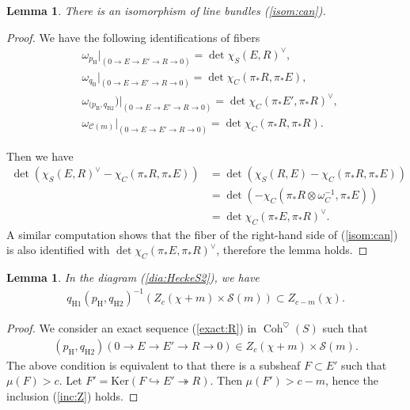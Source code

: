 \documentclass [11pt,oneside,a4paper,mathscr]{amsart}
\newtheorem{lemma}[thm]{Lemma}
\theoremstyle{definition}
\newcommand{\Coh}{\operatorname{Coh}}
\begin{document}
\begin{lemma}\label{lem:isomcan}
    There is an isomorphism of line bundles (\ref{isom:can}). 
\end{lemma}
    \begin{proof}
    We have the following 
identifications of fibers
\begin{align*}
    &\omega_{p_{\mathrm{H}}^{}}|_{(0\to E\to E'\to R\to 0)}=\det \chi_S(E, R)^{\vee}, \\
    &\omega_{q_{\mathrm{B}}^{}}|_{(0\to E\to E'\to R\to 0)}=\det \chi_C(\pi_{*}R, \pi_{*}E), \\
     &\omega_{(p_{\mathrm{B}}^{}, q_{\mathrm{B}2}^{}})|_{(0\to E\to E'\to R\to 0)}=\det \chi_C(\pi_{*}E', \pi_{*}R)^{\vee}, \\
     &\omega_{\mathcal{C}(m)}|_{(0\to E\to E'\to R\to 0)}=\det\chi_C(\pi_{*}R, \pi_{*}R).
\end{align*}

Then we have 
\begin{align*}
    \det (\chi_S(E, R)^{\vee}-\chi_C(\pi_{*}R, \pi_{*}E))&=
    \det(\chi_S(R, E)-\chi_C(\pi_{*}R, \pi_{*}E)) \\
    &=\det (-\chi_C(\pi_{*}R\otimes \omega_C^{-1}, \pi_{*}E))\\
    &=\det \chi_C(\pi_{*}E, \pi_{*}R)^{\vee}. 
\end{align*}
A similar computation shows that the fiber of 
the right-hand side of (\ref{isom:can}) is also identified with $\det \chi_C(\pi_{*}E, \pi_{*}R)^{\vee}$, therefore the lemma holds. 
    \end{proof}
    \begin{lemma}\label{lem:support}
In the diagram (\ref{dia:HeckeS2}), we have 
\begin{align}\label{inc:Z}
q_{\mathrm{H}1}^{}(p_{\mathrm{H}}^{}, q_{\mathrm{H}2}^{})^{-1}(Z_c(\chi+m)\times \mathcal{S}(m)) \subset Z_{c-m}(\chi).
\end{align}
    \end{lemma}
\begin{proof}
We consider an exact sequence (\ref{exact:R}) in $\Coh^{\heartsuit}(S)$
such that 
\begin{align*}
    (p_{\mathrm{H}}^{}, q_{\mathrm{H}2}^{})(0 \to E \to E' \to R \to 0) \in Z_c(\chi+m)\times \mathcal{S}(m). 
\end{align*}
The above condition is equivalent to that there is a
subsheaf $F \subset E'$ such that $\mu(F)>c$. 
Let $F'=\mathrm{Ker}(F\hookrightarrow E' \twoheadrightarrow R)$. 
Then $\mu(F') >c-m$, hence 
the inclusion (\ref{inc:Z}) holds. 
\end{proof}
\end{document}
